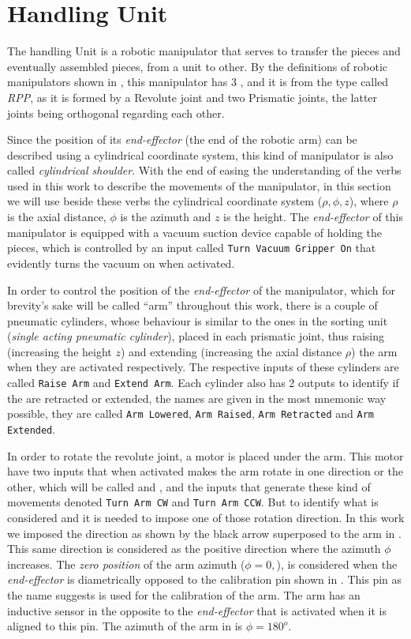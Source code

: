 \section{Handling Unit}
\label{sec:handlingUnit}
The handling Unit is a robotic manipulator that serves to transfer the pieces
and eventually assembled pieces, from a unit to other. By the definitions of
robotic manipulators shown in \cite{khalil2004modeling}, this manipulator has 3
\DOF{}, and it is from the type called \emph{RPP}, as
it is formed by a Revolute joint and two Prismatic joints, the latter joints
being orthogonal regarding each other.

Since the position of its
\emph{end-effector} (the end of the robotic arm) can be described using a
cylindrical coordinate system, this kind of manipulator is also called
\emph{cylindrical shoulder}. With the end of easing the understanding of the
verbs used in this work to describe the movements of the manipulator, in this
section we will use beside these verbs the cylindrical coordinate
system ($\rho,\phi,z$), where $\rho$ is the axial distance, $\phi$ is the azimuth
and $z$ is the height.
The \emph{end-effector} of this manipulator is equipped with a vacuum suction
device capable of holding the pieces, which is controlled by an input called
\verb|Turn Vacuum Gripper On| that evidently turns the vacuum on when activated.

In order to control the position of the \emph{end-effector} of the manipulator, which for brevity's sake will be called
``arm'' throughout this work, there is a couple of pneumatic cylinders, whose
behaviour is similar
to the ones in the sorting unit (\emph{single acting pneumatic cylinder}), placed in each
prismatic joint, thus raising (increasing the height $z$) and extending (increasing the
axial distance $\rho$) the arm when they are activated respectively. The
respective inputs
of these cylinders are called \verb|Raise Arm| and \verb|Extend Arm|. Each
cylinder also has 2 outputs to identify if the are retracted or extended, the
names are given in the most mnemonic way possible, they are called
\verb|Arm Lowered|, \verb|Arm Raised|, \verb|Arm Retracted| and
\verb|Arm Extended|.

In order to rotate the revolute joint, a motor is placed
under the arm. This motor have two inputs that when activated makes the arm
rotate in one direction or the other, which will be called \CW{} and \CCW, and
the inputs that generate these kind of movements denoted
\verb|Turn Arm CW| and \verb|Turn Arm CCW|. But to identify what is considered
\CW{} and \CCW{} it is needed to impose one of those rotation direction. In this
work we imposed the \CCW{} direction as shown by the black arrow superposed to
the arm in . This same direction is considered as the
positive direction where the azimuth $\phi$ increases. The
\emph{zero position} of the arm azimuth ($\phi=0,$), is considered when the
\emph{end-effector} is diametrically opposed to the calibration pin shown in
. This pin as the name suggests is used for the
calibration of the arm. The arm has an inductive sensor in the opposite to the
\emph{end-effector} that is activated when
it is aligned to this pin.  The azimuth of the arm in  is
$\phi=180^o$.

